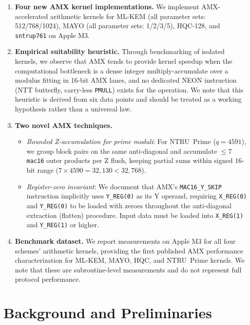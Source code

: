 \documentclass[utf8]{FrontiersinHarvard}
\begin{document}
\begin{enumerate}
  \item \textbf{Four new AMX kernel implementations.} We implement AMX-accelerated arithmetic kernels for ML-KEM (all parameter sets: 512/768/1024), MAYO (all parameter sets: 1/2/3/5), HQC-128, and \texttt{sntrup761} on Apple M3.
  
  \item \textbf{Empirical suitability heuristic.} Through benchmarking of isolated kernels, we observe that AMX tends to provide kernel speedup when the computational bottleneck is a dense integer multiply-accumulate over a modulus fitting in 16-bit AMX lanes, and no dedicated NEON instruction (NTT butterfly, carry-less \texttt{PMULL}) exists for the operation. We note that this heuristic is derived from six data points and should be treated as a working hypothesis rather than a universal law.
  
  \item \textbf{Two novel AMX techniques.}
  \begin{itemize}
    \item \emph{Bounded Z-accumulation for prime moduli}: For NTRU~Prime ($q = 4591$), we group block pairs on the same anti-diagonal and accumulate $\leq 7$ \texttt{mac16} outer products per Z flush, keeping partial sums within signed 16-bit range ($7 \times 4590 = 32{,}130 < 32{,}768$).
    \item \emph{Register-zero invariant}: We document that AMX's \texttt{MAC16\_Y\_SKIP} instruction implicitly uses \texttt{Y\_REG(0)} as its Y operand, requiring \texttt{X\_REG(0)} and \texttt{Y\_REG(0)} to be loaded with zeroes throughout the anti-diagonal extraction (flatten) procedure. Input data must be loaded into \texttt{X\_REG(1)} and \texttt{Y\_REG(1)} or higher.
  \end{itemize}
  
  \item \textbf{Benchmark dataset.} We report measurements on Apple M3 for all four schemes' arithmetic kernels, providing the first published AMX performance characterization for ML-KEM, MAYO, HQC, and NTRU~Prime kernels. We note that these are subroutine-level measurements and do not represent full protocol performance.
\end{enumerate}


\section{Background and Preliminaries}
\label{sec:background}
\end{document}
